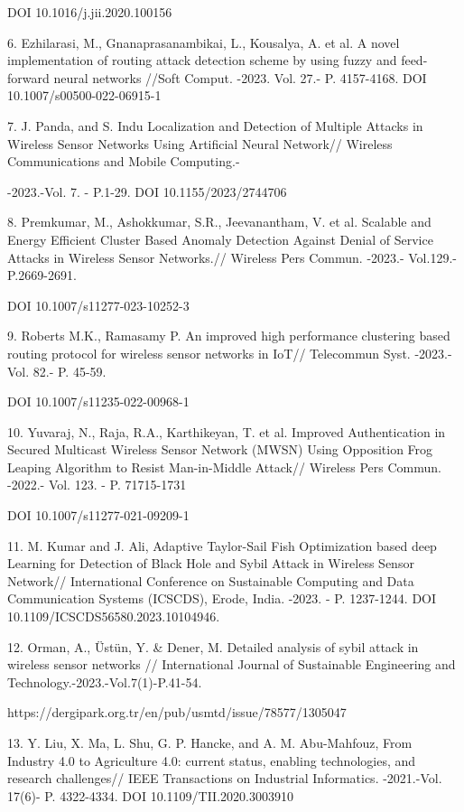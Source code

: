 DOI 10.1016/j.jii.2020.100156

6. Ezhilarasi, M., Gnanaprasanambikai, L., Kousalya, A. et al. A novel
implementation of routing attack detection scheme by using fuzzy and
feed-forward neural networks //Soft Comput. -2023. Vol. 27.- P.
4157-4168. DOI 10.1007/s00500-022-06915-1

7. J. Panda, and S. Indu Localization and Detection of Multiple Attacks
in Wireless Sensor Networks Using Artificial Neural Network// Wireless
Communications and Mobile Computing.-

-2023.-Vol. 7. - P.1-29. DOI 10.1155/2023/2744706

8. Premkumar, M., Ashokkumar, S.R., Jeevanantham, V. et al. Scalable and
Energy Efficient Cluster Based Anomaly Detection Against Denial of
Service Attacks in Wireless Sensor Networks.// Wireless Pers Commun.
-2023.- Vol.129.- P.2669-2691.

DOI 10.1007/s11277-023-10252-3

9. Roberts M.K., Ramasamy P. An improved high performance clustering
based routing protocol for wireless sensor networks in IoT// Telecommun
Syst. -2023.- Vol. 82.- P. 45-59.

DOI 10.1007/s11235-022-00968-1

10. Yuvaraj, N., Raja, R.A., Karthikeyan, T. et al. Improved
Authentication in Secured Multicast Wireless Sensor Network (MWSN) Using
Opposition Frog Leaping Algorithm to Resist Man-in-Middle Attack//
Wireless Pers Commun. -2022.- Vol. 123. - P. 71715-1731

DOI 10.1007/s11277-021-09209-1

11. M. Kumar and J. Ali, Adaptive Taylor-Sail Fish Optimization based
deep Learning for Detection of Black Hole and Sybil Attack in Wireless
Sensor Network// International Conference on Sustainable Computing and
Data Communication Systems (ICSCDS), Erode, India. -2023. - P.
1237-1244. DOI 10.1109/ICSCDS56580.2023.10104946.

12. Orman, A., Üstün, Y. \& Dener, M. Detailed analysis of sybil attack
in wireless sensor networks // International Journal of Sustainable
Engineering and Technology.-2023.-Vol.7(1)-P.41-54.

https://dergipark.org.tr/en/pub/usmtd/issue/78577/1305047

13. Y. Liu, X. Ma, L. Shu, G. P. Hancke, and A. M. Abu-Mahfouz, From
Industry 4.0 to Agriculture 4.0: current status, enabling technologies,
and research challenges// IEEE Transactions on Industrial Informatics.
-2021.-Vol. 17(6)- P. 4322-4334. DOI 10.1109/TII.2020.3003910

